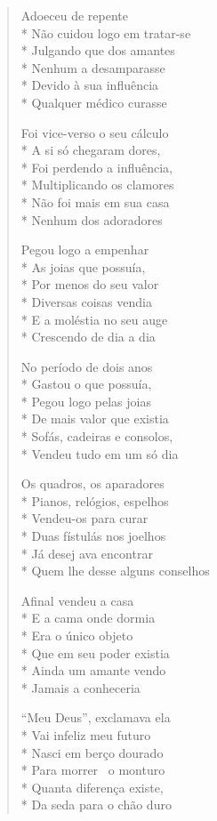 \begin{verse}
Adoeceu de repente\\*
Não cuidou logo em tratar-se\\*
Julgando que dos amantes\\*
Nenhum a desamparasse\\*
Devido à sua influência\\*
Qualquer médico curasse

Foi vice-verso o seu cálculo\\*
A si só chegaram dores,\\*
Foi perdendo a influência,\\*
Multiplicando os clamores\\*
Não foi mais em sua casa\\*
Nenhum dos adoradores

Pegou logo a empenhar\\*
As joias que possuía,\\*
Por menos do seu valor\\*
Diversas coisas vendia\\*
E a moléstia no seu auge\\*
Crescendo de dia a dia

No período de dois anos\\*
Gastou o que possuía,\\*
Pegou logo pelas joias\\*
De mais valor que existia\\*
Sofás, cadeiras e consolos,\\*
Vendeu tudo em um só dia

Os quadros, os aparadores\\*
Pianos, relógios, espelhos\\*
Vendeu-os para curar\\*
Duas fístulás nos joelhos\\*
Já desej ava encontrar\\*
Quem lhe desse alguns conselhos

Afinal vendeu a casa\\*
E a cama onde dormia\\*
Era o único objeto\\*
Que em seu poder existia\\*
Ainda um amante vendo\\*
Jamais a conheceria

``Meu Deus'', exclamava ela\\*
Vai infeliz meu futuro\\*
Nasci em berço dourado\\*
Para morrer ~o monturo\\*
Quanta diferença existe,\\*
Da seda para o chão duro


\end{verse}
